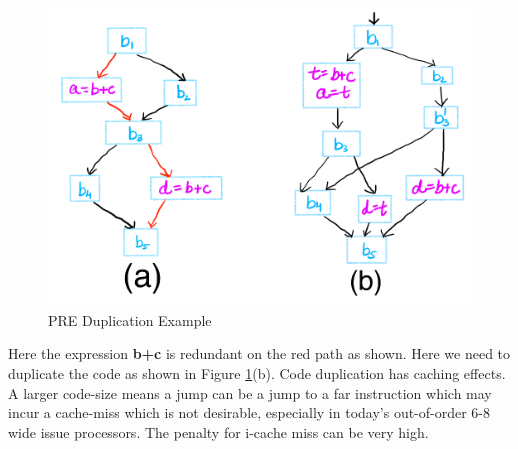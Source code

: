 \begin {itemize}
\begin{figure}[h]
\centering
\includegraphics[scale = 0.3]{images/mod_105_fig4.png}
\caption{PRE Duplication Example}
\label {fig:mod_105_04}
\end{figure}

Here the expression \textbf{b+c} is redundant on the red path as shown. Here we need to duplicate the code as shown in 
Figure \ref{fig:mod_105_04}(b). Code duplication has caching effects. A larger code-size means a jump can be a jump to 
a far instruction which may incur a cache-miss which is not desirable, especially in today's out-of-order 6-8 wide issue processors. 
The penalty for i-cache miss can be very high. 
\end{itemize}